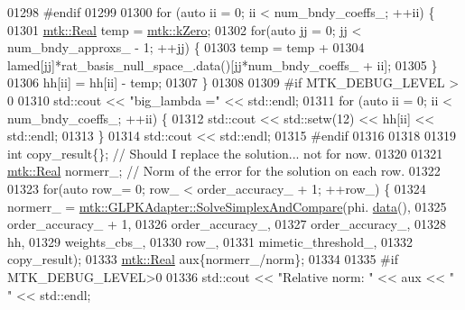 \begin{DoxyCode}
{{01298 \textcolor{preprocessor}{    #endif}
01299 
01300     \textcolor{keywordflow}{for} (\textcolor{keyword}{auto} ii = 0; ii < num\_bndy\_coeffs\_; ++ii) \{
01301       \hyperlink{group__c01-roots_gac080bbbf5cbb5502c9f00405f894857d}{mtk::Real} temp = \hyperlink{group__c01-roots_ga59a451a5fae30d59649bcda274fea271}{mtk::kZero};
01302       \textcolor{keywordflow}{for}(\textcolor{keyword}{auto} jj = 0; jj < num\_bndy\_approxs\_ - 1; ++jj) \{
01303         temp = temp +
01304           lamed[jj]*rat\_basis\_null\_space\_.data()[jj*num\_bndy\_coeffs\_ + ii];
01305       \}
01306       hh[ii] = hh[ii] - temp;
01307     \}
01308 
01309 \textcolor{preprocessor}{    #if MTK\_DEBUG\_LEVEL > 0}
01310     std::cout << \textcolor{stringliteral}{"big\_lambda ="} << std::endl;
01311     \textcolor{keywordflow}{for} (\textcolor{keyword}{auto} ii = 0; ii < num\_bndy\_coeffs\_; ++ii) \{
01312       std::cout << std::setw(12) << hh[ii] << std::endl;
01313     \}
01314     std::cout << std::endl;
01315 \textcolor{preprocessor}{    #endif}
01316 
01318 
01319     \textcolor{keywordtype}{int} copy\_result\{\};  \textcolor{comment}{// Should I replace the solution... not for now.}
01320 
01321     \hyperlink{group__c01-roots_gac080bbbf5cbb5502c9f00405f894857d}{mtk::Real} normerr\_; \textcolor{comment}{// Norm of the error for the solution on each row.}
01322 
01323     \textcolor{keywordflow}{for}(\textcolor{keyword}{auto} row\_= 0; row\_ < order\_accuracy\_ + 1; ++row\_) \{
01324       normerr\_ = \hyperlink{classmtk_1_1GLPKAdapter_a834480aca83e3c0d09fdab7fdb7e8a3f}{mtk::GLPKAdapter::SolveSimplexAndCompare}(phi.
      \hyperlink{classmtk_1_1DenseMatrix_a0c33b8a9e01d157c61ddbdf807c25d84}{data}(),
01325                                                           order\_accuracy\_ + 1,
01326                                                           order\_accuracy\_,
01327                                                           order\_accuracy\_,
01328                                                           hh,
01329                                                           weights\_cbs\_,
01330                                                           row\_,
01331                                                           mimetic\_threshold\_,
01332                                                           copy\_result);
01333       \hyperlink{group__c01-roots_gac080bbbf5cbb5502c9f00405f894857d}{mtk::Real} aux\{normerr\_/norm\};
01334 
01335 \textcolor{preprocessor}{      #if MTK\_DEBUG\_LEVEL>0}
01336       std::cout << \textcolor{stringliteral}{"Relative norm: "} << aux << \textcolor{stringliteral}{" "} << std::endl;
}}
\end{DoxyCode}
